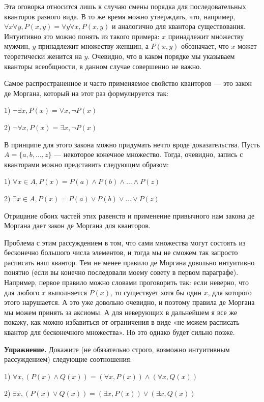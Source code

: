 Эта оговорка относится лишь к случаю смены порядка для последовательных кванторов разного вида. В то же время можно утверждать, что, например, $\forall x \forall y, P(x, y) = \forall y \forall x, P(x, y)$ и аналогично для квантора существования. Интуитивно это можно понять из такого примера: $x$ принадлежит множеству мужчин, $y$ принадлежит множеству женщин, а $P(x, y)$ обозначает, что $x$ может теоретически женится на $y$. Очевидно, что в каком порядке мы указываем кванторы всеобщности, в данном случае совершенно не важно.

Самое распространенное и часто применяемое свойство кванторов — это закон де Моргана, который на этот раз формулируется так:

1) $\neg \exists x, P(x) = \forall x, \neg P(x)$

2) $\neg \forall x, P(x) = \exists x, \neg P(x)$

В принципе для этого закона можно придумать нечто вроде доказательства. Пусть $A = \{a, b, \ldots, z\}$ — некоторое конечное множество. Тогда, очевидно, запись с кванторами можно представить  следующим образом:

1) $\forall x \in A, P(x) = P(a) \wedge P(b) \wedge \ldots \wedge P(z)$

2) $\exists x \in A, P(x) = P(a) \vee P(b) \vee \ldots \vee P(z)$

Отрицание обоих частей этих равенств и применение привычного нам закона де Моргана дает закон де Моргана для кванторов.

Проблема с этим рассуждением в том, что сами множества могут состоять из бесконечно большого числа элементов, и тогда мы не сможем так запросто расписать наш квантор. Тем не менее правило де Моргана довольно интуитивно понятно (если вы конечно последовали моему совету в первом параграфе). Например, первое правило можно словами проговорить так: если неверно, что для любого $x$ выполняется $P(x)$, то существует хотя бы один $x$, для которого этого нарушается. А это уже довольно очевидно, и поэтому правила де Моргана мы можем принять за аксиомы. А для неверующих в дальнейшем я все же покажу, как можно избавиться от ограничения в виде «не можем расписать квантор для бесконечного множества». Но это однако будет сильно позже.

{\bfseries Упражнение.} Докажите (не обязательно строго, возможно интуитивным рассуждением) следующие соотношения:

1) $\forall x, (P(x) \wedge Q(x)) = (\forall x, P(x))\wedge (\forall x, Q(x))$

2) $\exists x, (P(x) \vee Q(x)) = (\exists x, P(x))\vee (\exists x, Q(x))$

